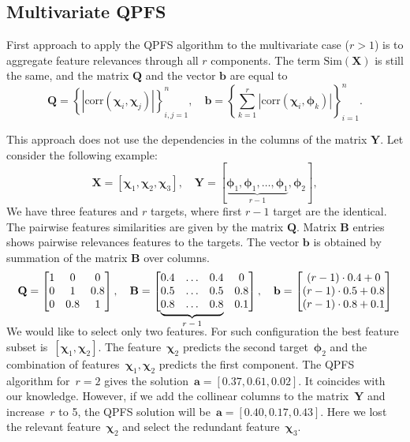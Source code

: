 \documentclass[12pt,twoside]{article}
\newcommand{\ba}{\mathbf{a}}
\newcommand{\bb}{\mathbf{b}}
\newcommand{\bY}{\mathbf{Y}}
\newcommand{\bX}{\mathbf{X}}
\newcommand{\bB}{\mathbf{B}}
\newcommand{\bQ}{\mathbf{Q}}
\newcommand{\bchi}{\boldsymbol{\chi}}
\newcommand{\bphi}{\boldsymbol{\phi}}
\newcommand\undermat[2]{%
	\makebox[0pt][l]{$\smash{\underbrace{\phantom{%
					\begin{matrix}#2\end{matrix}}}_{\text{$#1$}}}$}#2}
\begin{document}
\subsection{Multivariate QPFS}
First approach to apply the QPFS algorithm to the multivariate case ($r > 1$) is to aggregate feature relevances through all $r$ components. The term $\text{Sim}(\bX)$ is still the same, and the matrix $\bQ$ and the vector $\bb$ are equal to
\begin{equation*}
\bQ = \left\{\left|\text{corr}(\bchi_i, \bchi_j)\right|\right\}_{i,j=1}^n, \quad \bb = \left\{\sum_{k=1}^r\left|\text{corr}(\bchi_i, \bphi_k)\right|\right\}_{i=1}^n.
\end{equation*}

This approach does not use the dependencies in the columns of the matrix $\bY$. Let consider the following example:
\[
	\bX = [\bchi_1, \bchi_2, \bchi_3], \quad \bY = [\underbrace{\bphi_1, \bphi_1, \dots, \bphi_1}_{r-1}, \bphi_2],
\]
We have three features and $r$ targets, where first $r-1$ target are the identical. 
The pairwise features similarities are given by the matrix $\bQ$. 
Matrix $\bB$ entries shows pairwise relevances features to the targets. 
The vector $\bb$ is obtained by summation of the matrix $\bB$ over columns.
\[
	\bQ = \begin{bmatrix} 1 & 0 & 0\\ 0 & 1 & 0.8 \\ 0 & 0.8 & 1 \end{bmatrix}, \quad 
	\bB = \begin{bmatrix} 0.4 & \dots & 0.4 & 0 \\ 0.5 & \dots & 0.5 & 0.8 \\ \undermat{r-1}{0.8 & \dots & 0.8} & 0.1 \end{bmatrix}, \quad
	\bb = \begin{bmatrix} (r-1) \cdot 0.4 + 0 \\ (r-1) \cdot 0.5 + 0.8 \\ (r-1) \cdot 0.8 + 0.1 \end{bmatrix}
\]
	\vspace{0.5cm}

We would like to select only two features.
For such configuration the best feature subset is~$[\bchi_1, \bchi_2]$. 
The feature~$\bchi_2$ predicts the second target~$\bphi_2$ and the combination of features~$\bchi_1, \bchi_2$ predicts the first component. 
The QPFS algorithm for~$r=2$ gives the solution~$\ba = [0.37,	0.61,	0.02]$. It coincides with our knowledge. 
However, if we add the collinear columns to the matrix~$\bY$ and increase~$r$ to 5, the QPFS solution will be~$\ba = [0.40,	0.17, 0.43]$. 
Here we lost the relevant feature~$\bchi_2$ and select the redundant feature~$\bchi_3$.
\end{document}
